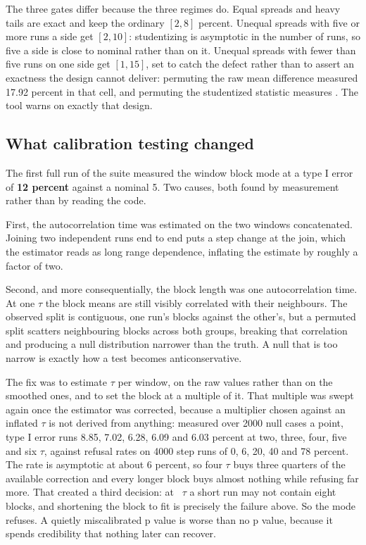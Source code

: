 \documentclass[11pt,a4paper]{report}
\begin{document}
The three gates differ because the three regimes do. Equal spreads and heavy
tails are exact and keep the ordinary $[2, 8]$ percent. Unequal spreads with five
or more runs a side get $[2, 10]$: studentizing is asymptotic in the number of
runs, so five a side is close to nominal rather than on it. Unequal spreads with
fewer than five runs on one side get $[1, 15]$, set to catch the defect rather
than to assert an exactness the design cannot deliver: permuting the raw mean
difference measured 17.92 percent in that cell, and permuting the studentized
statistic measures \facttypeonesevenagainstthree{}. The tool warns on exactly
that design.

\subsection{What calibration testing changed}

The first full run of the suite measured the window block mode at a type I error
of \textbf{12 percent} against a nominal 5. Two causes, both found by measurement
rather than by reading the code.

First, the autocorrelation time was estimated on the two windows concatenated.
Joining two independent runs end to end puts a step change at the join, which the
estimator reads as long range dependence, inflating the estimate by roughly a
factor of two.

Second, and more consequentially, the block length was one autocorrelation time.
At one $\tau$ the block means are still visibly correlated with their neighbours.
The observed split is contiguous, one run's blocks against the other's, but a
permuted split scatters neighbouring blocks across both groups, breaking that
correlation and producing a null distribution narrower than the truth. A null
that is too narrow is exactly how a test becomes anticonservative.

The fix was to estimate $\tau$ per window, on the raw values rather than on the
smoothed ones, and to set the block at a multiple of it. That multiple was swept
again once the estimator was corrected, because a multiplier chosen against an
inflated $\tau$ is not derived from anything: measured over 2000 null cases a
point, type I error runs 8.85, 7.02, 6.28, 6.09 and 6.03 percent at two, three,
four, five and six $\tau$, against refusal rates on 4000 step runs of 0, 6, 20,
40 and 78 percent. The rate is asymptotic at about 6 percent, so four $\tau$ buys
three quarters of the available correction and every longer block buys almost
nothing while refusing far more. That created a third decision: at
\factblocktaumultiplier{}~$\tau$ a short run may not contain eight blocks, and
shortening the block to fit is precisely the failure above. So the mode refuses.
A quietly miscalibrated p value is worse than no p value, because it spends
credibility that nothing later can recover.
\end{document}
